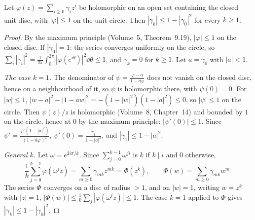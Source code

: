 \begin{lemma}\label{conjectures:lem:coef}
Let $\varphi(z)=\sum_{i\ge0}\gamma_iz^i$ be holomorphic on an open set containing the closed unit disc, with $|\varphi|\le1$ on the unit circle. Then
$|\gamma_k|\le1-|\gamma_0|^2$ for every $k\ge1$.
\end{lemma}
\begin{proof}
By the maximum principle (Volume~5, Theorem~9.19), $|\varphi|\le1$ on the closed disc. If $|\gamma_0|=1$: the series converges uniformly on the circle, so
$\sum_i|\gamma_i|^2=\frac1{2\pi}\int_0^{2\pi}|\varphi(e^{i\theta})|^2\dd\theta\le1$, and $\gamma_k=0$ for $k\ge1$. Let $a=\gamma_0$ with $|a|<1$.

\emph{The case $k=1$.} The denominator of $\psi=\frac{\varphi-a}{1-\bar a\varphi}$ does not vanish on the closed disc, hence on a neighbourhood of it, so
$\psi$ is holomorphic there, with $\psi(0)=0$. For $|w|\le1$, $|w-a|^2-|1-\bar aw|^2=-(1-|w|^2)(1-|a|^2)\le0$, so $|\psi|\le1$ on the circle. Then
$\psi(z)/z$ is holomorphic (Volume~8, Chapter~14) and bounded by $1$ on the circle, hence at $0$ by the maximum principle: $|\psi'(0)|\le1$. Since
$\psi'=\frac{\varphi'(1-|a|^2)}{(1-\bar a\varphi)^2}$, $\psi'(0)=\frac{\gamma_1}{1-|a|^2}$, and $|\gamma_1|\le1-|a|^2$.

\emph{General $k$.} Let $\omega=e^{2i\pi/k}$. Since $\sum_{j=0}^{k-1}\omega^{ji}$ is $k$ if $k\mid i$ and $0$ otherwise,
\[
\frac1k\sum_{j=0}^{k-1}\varphi(\omega^jz)=\sum_{m\ge0}\gamma_{mk}z^{mk}=\Phi(z^k),\qquad\Phi(w)=\sum_{m\ge0}\gamma_{mk}w^m.
\]
The series $\Phi$ converges on a disc of radius $>1$, and on $|w|=1$, writing $w=z^k$ with $|z|=1$, $|\Phi(w)|\le\frac1k\sum_j|\varphi(\omega^jz)|\le1$.
The case $k=1$ applied to $\Phi$ gives $|\gamma_k|\le1-|\gamma_0|^2$.
\end{proof}

